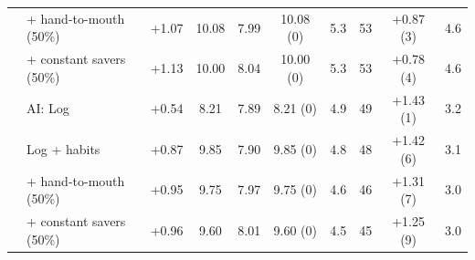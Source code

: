 \begin{tabular}{llcccccccc}
 & + hand-to-mouth (50\%) & +1.07 & 10.08 & 7.99 & 10.08 (0) & 5.3 & 53 & +0.87 (3) & 4.6\\
 & + constant savers (50\%) & +1.13 & 10.00 & 8.04 & 10.00 (0) & 5.3 & 53 & +0.78 (4) & 4.6\\
\midrule
 & AI: Log & +0.54 & 8.21 & 7.89 & 8.21 (0) & 4.9 & 49 & +1.43 (1) & 3.2\\
 & Log + habits & +0.87 & 9.85 & 7.90 & 9.85 (0) & 4.8 & 48 & +1.42 (6) & 3.1\\
 & + hand-to-mouth (50\%) & +0.95 & 9.75 & 7.97 & 9.75 (0) & 4.6 & 46 & +1.31 (7) & 3.0\\
 & + constant savers (50\%) & +0.96 & 9.60 & 8.01 & 9.60 (0) & 4.5 & 45 & +1.25 (9) & 3.0\\
\bottomrule\end{tabular}
